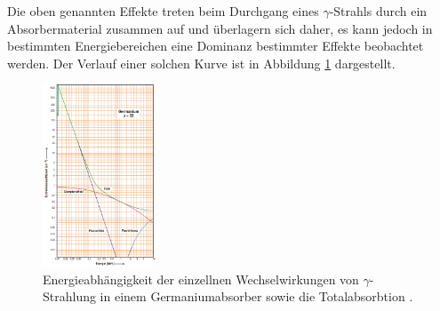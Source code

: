 Die oben genannten Effekte treten beim Durchgang eines $\gamma$-Strahls durch ein
Absorbermaterial zusammen auf und überlagern sich daher, es kann jedoch in bestimmten
Energiebereichen eine Dominanz bestimmter Effekte beobachtet werden. Der Verlauf einer solchen
Kurve ist in Abbildung \ref{abb:1} dargestellt.
\begin{figure}[h]
  \centering
    \includegraphics[width=0.3\textwidth]{Germanium.png}
    \caption{Energieabhängigkeit der einzellnen Wechselwirkungen von $\gamma$-Strahlung in
    einem Germaniumabsorber sowie die Totalabsorbtion \cite{anleitung}.}
    \label{abb:1}
\end{figure}
